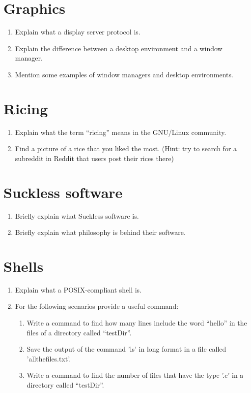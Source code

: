 \documentclass[titlepage]{article}
\begin{document}
\section{Graphics}
\begin{enumerate}
    \item Explain what a display server protocol is.
    \item Explain the difference between a desktop environment and a window manager.
    \item Mention some examples of window managers and desktop environments.
\end{enumerate}

\section{Ricing}
\begin{enumerate}
    \item Explain what the term “ricing” means in the GNU/Linux community.
    \item Find a picture of a rice that you liked the most. (Hint: try to search for a subreddit in Reddit that users post their rices there)
\end{enumerate}

\section{Suckless software}
\begin{enumerate}
    \item Briefly explain what Suckless software is.
    \item Briefly explain what philosophy is behind their software.
\end{enumerate}

\section{Shells}
\begin{enumerate}
    \item Explain what a POSIX-compliant shell is.
    \item For the following scenarios provide a useful command:
    \begin{enumerate}
        \item Write a command to find how many lines include the word “hello” in the files of a directory called “testDir”.
        \item Save the output of the command 'ls' in long format in a file called 'allthefiles.txt'.
        \item Write a command to find the number of files that have the type '.c' in a directory called “testDir”.
    \end{enumerate}
\end{enumerate}
\end{document}
